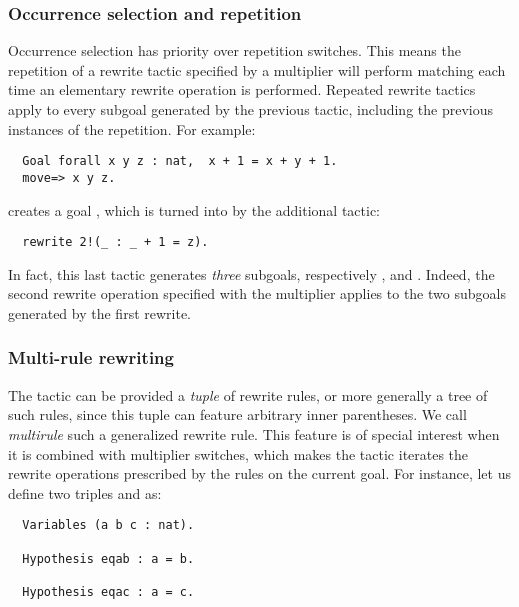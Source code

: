 \subsubsection*{Occurrence selection and repetition}
Occurrence selection has priority over repetition switches. This means
the repetition of a rewrite tactic specified by a multiplier
will perform matching each time an elementary rewrite operation is
performed. Repeated rewrite tactics apply to every subgoal generated
by the previous tactic, including the previous instances of the
repetition. For example:
\begin{lstlisting}
  Goal forall x y z : nat,  x + 1 = x + y + 1.
  move=> x y z.
\end{lstlisting}
creates a goal , which is turned into 
by the additional tactic:
\begin{lstlisting}
  rewrite 2!(_ : _ + 1 = z).
\end{lstlisting}
In fact, this last tactic generates \emph{three} subgoals,
respectively
,  and . Indeed, the second
rewrite operation specified with the  multiplier applies to
the two subgoals generated by the first rewrite.

\subsubsection*{Multi-rule rewriting}
The  tactic can be provided a \emph{tuple} of rewrite rules,
or more generally a tree of such rules, since this tuple can feature
arbitrary inner parentheses. We call \emph{multirule} such a
generalized rewrite rule. This feature is of special interest when it
is combined with  multiplier switches, which makes the 
tactic iterates the rewrite operations prescribed by the rules on the
current goal. For instance, let us define two triples  and
 as:
\begin{lstlisting}
  Variables (a b c : nat).

  Hypothesis eqab : a = b.

  Hypothesis eqac : a = c.
\end{lstlisting}

